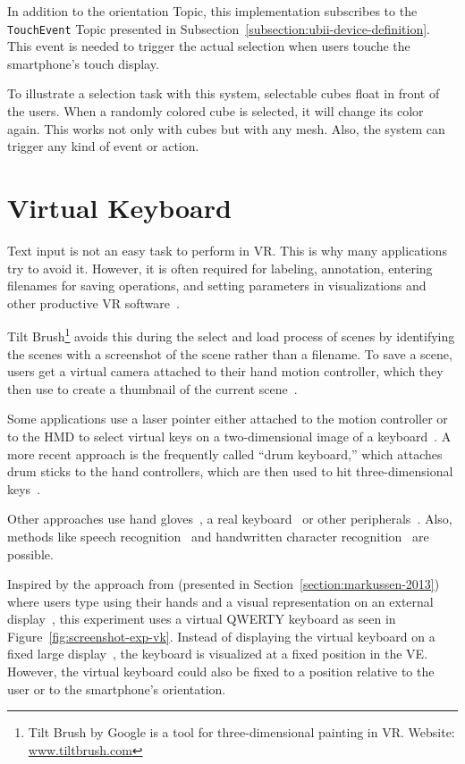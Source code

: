 In addition to the orientation Topic, this implementation subscribes to the \lstinline{TouchEvent} Topic presented in Subsection~\ref{subsection:ubii-device-definition}. This event is needed to trigger the actual selection when users touche the smartphone's touch display.

To illustrate a selection task with this system, selectable cubes float in front of the users. 
When a randomly colored cube is selected, it will change its color again. This works not only with cubes but with any mesh. Also, the system can trigger any kind of event or action.


\section{Virtual Keyboard}\label{section:virtual-keyboard}

Text input is not an easy task to perform in \gls{VR}. This is why many applications try to avoid it. However, it is often required for labeling, annotation, entering filenames for saving operations, and setting parameters in visualizations and other productive \gls{VR} software~\cite[2154]{Rhoton.2002}. 

Tilt Brush\footnote{Tilt Brush by Google is a tool for three-dimensional painting in VR. Website: \href{https://www.tiltbrush.com/}{www.tiltbrush.com}} avoids this during the select and load process of scenes by identifying the scenes with a screenshot of the scene rather than a filename. To save a scene, users get a virtual camera attached to their hand motion controller, which they then use to create a thumbnail of the current scene~\cite{GoogleLLC.2019}. %

Some applications use a laser pointer either attached to the motion controller or to the \gls{HMD} to select virtual keys on a two-dimensional image of a keyboard~\cite{Speicher.2018}. A more recent approach is the frequently called \enquote{drum keyboard,} which attaches drum sticks to the hand controllers, which are then used to hit three-dimensional keys~\cite{Weisel.2017}.

Other approaches use hand gloves~\cite{Evans.1999,Rhoton.2002}, a real keyboard~\cite{McGill.2015,Walker.2017} or other peripherals~\cite[111\psq]{Gonzalez.2009}. Also, methods like speech recognition~\cite[2154\psqq]{Rhoton.2002} and handwritten character recognition~\cite[113]{Gonzalez.2009} are possible.

Inspired by the approach from \citeauthor{Markussen.2013} (presented in Section~\ref{section:markussen-2013}) where users type using their hands and a visual representation on an external display~\cite[408]{Markussen.2013}, this experiment uses a virtual QWERTY keyboard as seen in Figure~\ref{fig:screenshot-exp-vk}.
Instead of displaying the virtual keyboard on a fixed large display~\cite[408]{Markussen.2013}, the keyboard is visualized at a fixed position in the \gls{VE}. However, the virtual keyboard could also be fixed to a position relative to the user or to the smartphone's orientation.

